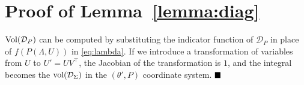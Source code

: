 \documentclass[Afour,sageh,times]{sagej}
\renewcommand{\qed}{\hfill\blacksquare}
\begin{document}



\section{Proof of Lemma~\ref{lemma:diag} }
\label{app:diag}
$\textup{Vol}(\mathcal{D}_P)$ can be computed by substituting the indicator function of $\mathcal{D}_P$ in place of $f(P(\Lambda,U))$ in \eqref{eq:lambda}. If we introduce a transformation of variables from $U$ to $U'=U V^\top$, the Jacobian of the transformation is  $1$, and the integral becomes  the $\textup{vol}(\mathcal{D}_\Sigma)$ in the $(\theta', P)$ coordinate system. $\qed$ 
\end{document}
